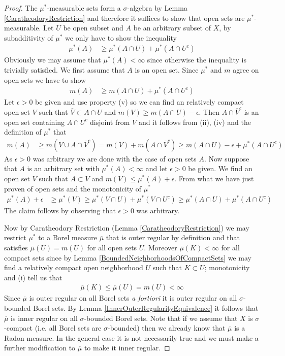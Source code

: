 \begin{proof}
The $\mu^*$-measurable sets form a $\sigma$-algebra by Lemma
\ref{CaratheodoryRestriction} and therefore it suffices to show that
open sets are $\mu^*$-measurable.  Let $U$ be open subset and $A$ be an
arbitrary subset of $X$, by subadditivity of $\mu^*$ we only have to
show the inequality 
\begin{align*}
\mu^*(A) &\geq \mu^*(A \cap U) + \mu^*(A \cap U^c)
\end{align*}
Obviously we may assume that $\mu^*(A) < \infty$ since otherwise the
inequality is trivially satisfied.  
We first assume that $A$ is an open set.  Since $\mu^*$ and $m$ agree
on open sets we have to show
\begin{align*}
m(A) &\geq m(A \cap U) + \mu^*(A \cap U^c)
\end{align*}
Let $\epsilon > 0$ be given and use property (v) so we can find an relatively compact open set $V$ such
that $\overline{V} \subset A \cap U$ and $m(V) \geq m(A \cap U) -
\epsilon$.  Then $A \cap \overline{V}^c$ is an open set containing $A
\cap U^c$ disjoint from $V$ and it follows from (ii), (iv)  and the
definition of $\mu^*$ that
\begin{align*}
m(A) &\geq m(V \cup A \cap \overline{V}^c) = m(V) + m(A \cap
\overline{V}^c) \geq m(A \cap U) - \epsilon + \mu^*(A \cap U^c) 
\end{align*}
As $\epsilon > 0$ was arbitrary we are done with the case of open
sets $A$.  Now suppose that $A$ is an arbitrary set with $\mu^*(A) <
\infty$ and let $\epsilon
> 0$ be given.  We find an open set $V$ such that $A \subset V$ and
$m(V) \leq \mu^*(A) + \epsilon$.  From what we have just proven of
open sets and the monotonicity of $\mu^*$
\begin{align*}
\mu^*(A) + \epsilon &\geq \mu^*(V) \geq \mu^*(V \cap U) + \mu^*(V \cap
U^c) \geq \mu^*(A \cap U) + \mu^*(A \cap U^c) 
\end{align*}
The claim follows by observing that $\epsilon >0$ was arbitrary.

Now by Caratheodory Restriction (Lemma \ref{CaratheodoryRestriction}) we may restrict $\mu^*$ to a Borel measure
$\overline{\mu}$ that is outer regular by definition and that
satisfies $\overline{\mu}(U) = m(U)$ for all open sets $U$.  Moreover
$\overline{\mu}(K) < \infty$ for all compact sets since by Lemma
\ref{BoundedNeighborhoodsOfCompactSets} we may find a relatively
compact open neighborhood $U$ such that $K \subset U$; monotonicity
and (i) tell us that 
\begin{align*}
\overline{\mu}(K) \leq \overline{\mu}(U) = m(U) <
\infty
\end{align*}  
Since $\overline{\mu}$ is outer regular on all Borel sets \emph{a fortiori}
it is outer regular on all $\sigma$-bounded Borel sets.  By  Lemma
\ref{InnerOuterRegularityEquivalence} it follows that
$\overline{\mu}$ is inner regular on all $\sigma$-bounded Borel sets.
Note that if we assume that $X$ is $\sigma$-compact (i.e. all Borel
sets are $\sigma$-bounded) then we already know that $\overline{\mu}$
is a Radon measure.  In the general case it is not necessarily true
and we must make a further modification to $\overline{\mu}$ to make it
inner regular.


\end{proof}
